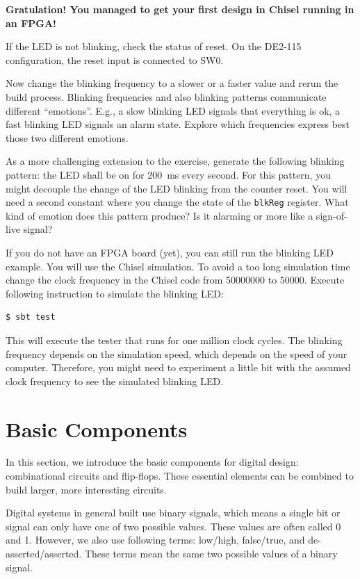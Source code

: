 \documentclass[%
    10pt,
    headinclude, footexclude,
    openright, %
    notitlepage,
    cleardoubleempty,
    headsepline,
    pointlessnumbers,
    bibtotoc, idxtotoc,
    ]{scrbook}
\newcommand{\code}[1]{{\small{\texttt{#1}}}}
\begin{document}
{\bf Gratulation! You managed to get your first design in Chisel running in an FPGA!}

If the LED is not blinking, check the status of reset. On the DE2-115 configuration,
the reset input is connected to SW0.

Now change the blinking frequency to a slower or a faster value and
rerun the build process. Blinking frequencies and also blinking patterns
communicate different ``emotions''. E.g., a slow blinking LED signals that
everything is ok, a fast blinking LED signals an alarm state.
Explore which frequencies express best those two different emotions.

As a more challenging extension to the exercise, generate the following blinking pattern:
the LED shall be on for 200~ms every second. For this pattern, you might
decouple the change of the LED blinking from the counter reset.
You will need a second constant where you change the state of the
\code{blkReg} register. What kind of emotion does this pattern produce?
Is it alarming or more like a sign-of-live signal?

If you do not have an FPGA board (yet), you can still run the blinking LED example.
You will use  the Chisel simulation. To avoid a too long simulation time change the
clock frequency in the Chisel code from 50000000 to 50000. Execute following
instruction to simulate the blinking LED:

\begin{verbatim}
$ sbt test
\end{verbatim}

This will execute the tester that runs for one million clock cycles.
The blinking frequency depends on the simulation speed, which depends on the
speed of your computer. Therefore, you might need to experiment a little bit
with the assumed clock frequency to see the simulated blinking LED.

\chapter{Basic Components}

In this section, we introduce the basic components for digital design:
combinational circuits and flip-flops.
These essential elements can be combined to build larger, more interesting circuits.

Digital systems in general built use binary signals, which means a single bit or signal
can only have one of two possible values. These values are often called 0 and 1. However, we
also use following terms: low/high, false/true, and de-asserted/asserted.
These terms mean the same two possible values of a binary signal.
\end{document}
